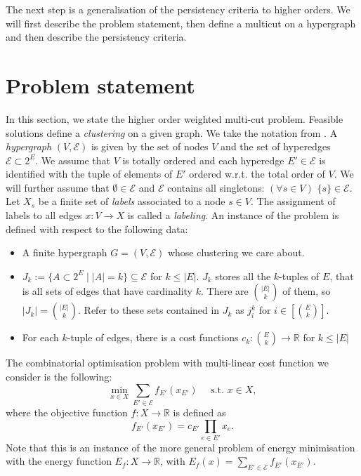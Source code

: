 The next step is a generalisation of the persistency criteria to higher orders. We will first describe the problem statement, then define a multicut on a hypergraph and then describe the persistency criteria. 

\section{Problem statement}
In this section, we state the higher order weighted multi-cut problem. Feasible solutions define a \textit{clustering} on a given graph. We take the notation from \cite{Shek}. A \textit{hypergraph} $(V,\mathcal{E})$ is given by the set of nodes $V$ and the set of hyperedges $\mathcal{E} \subset 2^E$. We assume that $V$ is totally ordered and each hyperedge $E' \in \mathcal{E}$ is identified with the tuple of elements of $E'$ ordered w.r.t. the total order of $V$. We will further assume that $\emptyset \in \mathcal{E}$ and $\mathcal{E}$ contains all singletons: $(\forall s \in V)$  $\{s \} \in \mathcal{E}$. Let $X_s$ be a finite set of \textit{labels} associated to a node $s \in V$. The assignment of labels to all edges $x: V \to X$ is called a \textit{labeling}. An instance of the problem is defined with respect to the following data: \begin{itemize}
    \item A finite hypergraph $G=(V,\mathcal{E})$ whose clustering we care about. 
    \item $J_k:=\{A \subset 2^E \mid |A|=k\}\subseteq \mathcal{E}$ for $k \leq |E|$. $J_k$ stores all the $k$-tuples of $E$, that is all sets of edges that have cardinality $k$. There are $\binom{|E|}{k}$ of them, so $|J_k|=\binom{|E|}{k}$. Refer to these sets contained in $J_k$ as $j^k_{i}$ for $i \in [\binom{E}{k}]$.
    \item For each $k$-tuple of edges, there is a cost functions $c_k \colon {E \choose k} \to \mathbb{R}$ for $k \leq |E|$
\end{itemize}
The combinatorial optimisation problem with multi-linear cost function we consider is the following:
\begin{equation}
\tag{P}
\min_{x \in X} \sum_{E' \in \mathcal{E}} f_{E'}(x_{E'}) \quad \text{ s.t. } x \in X, 
\end{equation}
where the objective function $f: X \rightarrow \mathbb{R}$ is defined as \[ f_{E'}(x_{E'})=c_{E'} \prod_{e \in E'} x_e. \] 
Note that this is an instance of the more general problem of energy minimisation with the energy function $E_f: X \to \mathbb{R}$, with $E_f(x)=\sum_{E' \in \mathcal{E}} f_{E'}(x_{E'})$.
